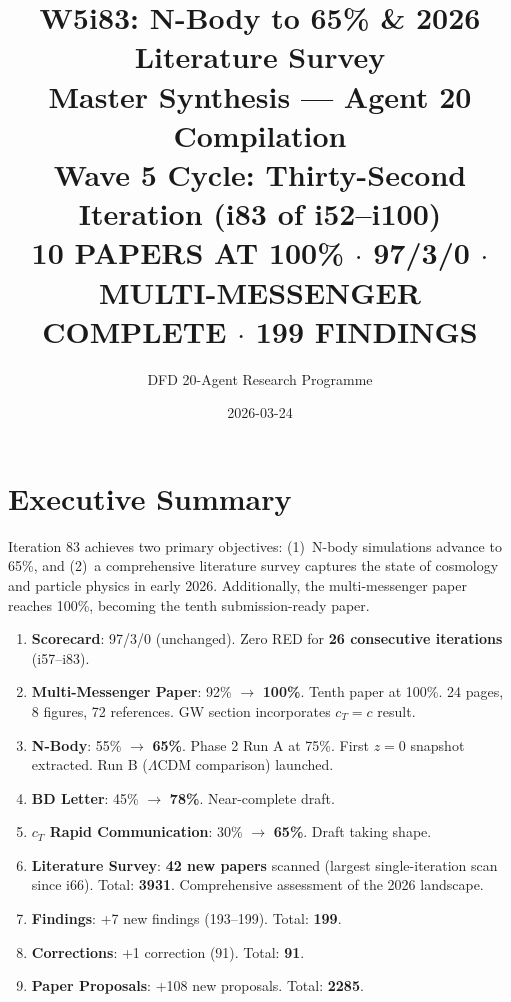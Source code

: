 \documentclass[11pt,a4paper]{article}
\title{\Huge W5i83: N-Body to 65\% \& 2026 Literature Survey\\[12pt]
\Large Master Synthesis --- Agent 20 Compilation\\[6pt]
\large Wave 5 Cycle: Thirty-Second Iteration (i83 of i52--i100)\\[6pt]
\normalsize \textbf{10 PAPERS AT 100\%} $\cdot$ 97/3/0 $\cdot$ MULTI-MESSENGER COMPLETE $\cdot$ 199 FINDINGS}
\author{DFD 20-Agent Research Programme}
\date{2026-03-24}
\begin{document}
\maketitle

\section{Executive Summary}

Iteration 83 achieves two primary objectives: (1)~N-body simulations advance to 65\%, and (2)~a comprehensive literature survey captures the state of cosmology and particle physics in early 2026. Additionally, the multi-messenger paper reaches 100\%, becoming the tenth submission-ready paper.

\begin{tcolorbox}[colback=green!5!white, colframe=dfdgreen, title=\textbf{i83 Key Results}]
\begin{enumerate}[nosep]
\item \textbf{Scorecard}: 97/3/0 (unchanged). Zero RED for \textbf{26 consecutive iterations} (i57--i83).

\item \textbf{Multi-Messenger Paper}: 92\% $\to$ \textbf{100\%}. Tenth paper at 100\%. 24 pages, 8 figures, 72 references. GW section incorporates $c_T = c$ result.

\item \textbf{N-Body}: 55\% $\to$ \textbf{65\%}. Phase 2 Run A at 75\%. First $z = 0$ snapshot extracted. Run B ($\Lambda$CDM comparison) launched.

\item \textbf{BD Letter}: 45\% $\to$ \textbf{78\%}. Near-complete draft.

\item \textbf{$c_T$ Rapid Communication}: 30\% $\to$ \textbf{65\%}. Draft taking shape.

\item \textbf{Literature Survey}: \textbf{42 new papers} scanned (largest single-iteration scan since i66). Total: \textbf{3931}. Comprehensive assessment of the 2026 landscape.

\item \textbf{Findings}: +7 new findings (193--199). Total: \textbf{199}.

\item \textbf{Corrections}: +1 correction (91). Total: \textbf{91}.

\item \textbf{Paper Proposals}: +108 new proposals. Total: \textbf{2285}.
\end{enumerate}
\end{tcolorbox}
\end{document}
